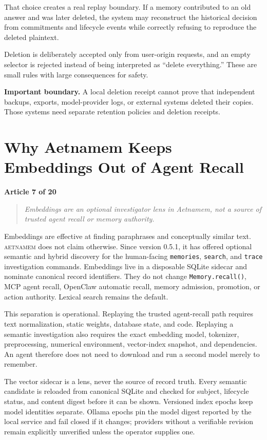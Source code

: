 \documentclass[11pt]{article}
\newcommand{\system}{\textsc{aetnamem}}
\newcommand{\articlelabel}[1]{%
  \noindent\colorbox{aetnaTeal!10}{%
    \parbox{0.96\textwidth}{\color{aetnaInk}\small\textbf{Article #1 of 20}}}%
  \par\medskip}
\newcommand{\coreidea}[1]{%
  \begin{quote}\color{aetnaTeal}\large\itshape #1\end{quote}}
\newcommand{\boundary}[1]{%
  \par\smallskip\noindent\textbf{Important boundary.} #1}
\begin{document}
That choice creates a real replay boundary. If a memory contributed to an old
answer and was later deleted, the system may reconstruct the historical
decision from commitments and lifecycle events while correctly refusing to
reproduce the deleted plaintext.

Deletion is deliberately accepted only from user-origin requests, and an
empty selector is rejected instead of being interpreted as ``delete
everything.'' These are small rules with large consequences for safety.

\boundary{A local deletion receipt cannot prove that independent backups,
exports, model-provider logs, or external systems deleted their copies. Those
systems need separate retention policies and deletion receipts.}

\clearpage
\section{Why Aetnamem Keeps Embeddings Out of Agent Recall}
\articlelabel{7}
\coreidea{Embeddings are an optional investigator lens in Aetnamem, not a
source of trusted agent recall or memory authority.}

Embeddings are effective at finding paraphrases and conceptually similar
text. \system{} does not claim otherwise. Since version 0.5.1, it has offered
optional semantic and hybrid discovery for the human-facing
\texttt{memories}, \texttt{search}, and \texttt{trace} investigation
commands. Embeddings live in a disposable SQLite sidecar and nominate
canonical record identifiers. They do not change \texttt{Memory.recall()},
MCP agent recall, OpenClaw automatic recall, memory admission, promotion, or
action authority. Lexical search remains the default.

This separation is operational. Replaying the trusted agent-recall path
requires text normalization, static weights, database state, and code.
Replaying a semantic investigation also requires the exact embedding model,
tokenizer, preprocessing, numerical environment, vector-index snapshot, and
dependencies. An agent therefore does not need to download and run a second
model merely to remember.

The vector sidecar is a lens, never the source of record truth. Every semantic
candidate is reloaded from canonical SQLite and checked for subject, lifecycle
status, and content digest before it can be shown. Versioned index epochs keep
model identities separate. Ollama epochs pin the model digest reported by the
local service and fail closed if it changes; providers without a verifiable
revision remain explicitly unverified unless the operator supplies one.
\end{document}
